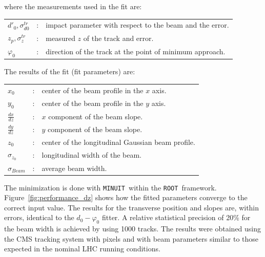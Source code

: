 \documentclass{cmspaper}
\def\root   {\texttt{ROOT }}
\def\minuit {\texttt{MINUIT }}
\begin{document}
\noindent
where the measurements used in the fit are:

\noindent
\begin{tabular}{lcl}
$d'_0,\sigma_{d0}^{tr}$  &:& impact parameter with respect to the beam and the error.\\
$z_p, \sigma_z^{tr}$ &:& measured $z$ of the track and error.\\
$\varphi_0$ &:& direction of the track at the point of minimum approach.\\
\end{tabular}

The results of the fit (fit parameters) are: 

\noindent
\begin{tabular}{lcl}
$x_0$           &:& center of the beam profile in the $x$ axis.\\
$y_0$           &:& center of the beam profile in the $y$ axis.\\
$\frac{dx}{dz}$ &:& $x$ component of the beam slope.\\
$\frac{dy}{dz}$ &:& $y$ component of the beam slope.\\
$z_0$           &:& center of the longitudinal Gaussian beam profile.\\
$\sigma_{z_0}$  &:& longitudinal width of the beam.\\
$\sigma_{Beam}$ &:& average beam width.\\
\end{tabular}


The minimization is done with \minuit within the \root framework. 
Figure~\ref{fig:performance_dz} shows how 
the fitted parameters converge to the correct input value. The results for the transverse position and 
slopes are, within errors,  identical to the $d_0-\varphi_0$ fitter. 
A relative statistical precision of 20\%  for the beam width is achieved by using 1000 tracks. 
The results were obtained using the CMS tracking system with pixels and with beam parameters similar to those expected in the nominal LHC
running conditions.  
\end{document}
